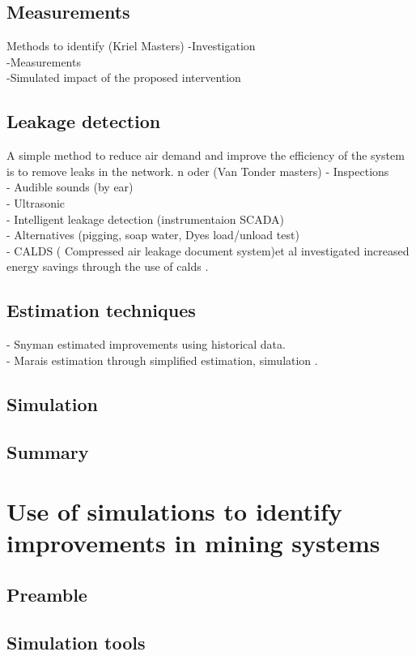 	\subsection{Measurements}	
		Methods to identify 
		(Kriel Masters)
		-Investigation\\
		-Measurements\\
		-Simulated impact of the proposed intervention\\
	\subsection{Leakage detection}
		A simple method to reduce air demand and improve the efficiency of the system is to remove leaks in the network. n oder
		(Van Tonder masters)
		- Inspections\\
		- Audible sounds (by ear)\\
		- Ultrasonic\\
		- Intelligent leakage detection (instrumentaion SCADA)\\
		- Alternatives (pigging, soap water, Dyes load/unload test)\\
		-  CALDS ( Compressed air leakage document system)et al investigated increased energy savings through the use of \gls{calds} \cite{marais2009increased}.	
	\subsection{Estimation techniques}
		- Snyman estimated improvements using historical data.\cite{Snyman2011Masters}\\
		- Marais estimation through simplified estimation, simulation \cite{Marais2012PhD, marais2013simplification}.
	\subsection{Simulation}
	\subsection{Summary}
\clearpage	
\section{Use of simulations to identify improvements in mining systems}
	\subsection{Preamble}
	\subsection{Simulation tools}
